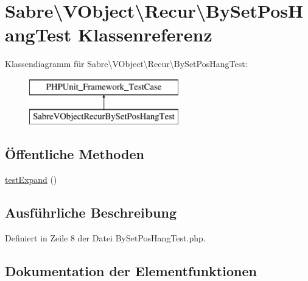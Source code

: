 \hypertarget{class_sabre_1_1_v_object_1_1_recur_1_1_by_set_pos_hang_test}{}\section{Sabre\textbackslash{}V\+Object\textbackslash{}Recur\textbackslash{}By\+Set\+Pos\+Hang\+Test Klassenreferenz}
\label{class_sabre_1_1_v_object_1_1_recur_1_1_by_set_pos_hang_test}
Klassendiagramm für Sabre\textbackslash{}V\+Object\textbackslash{}Recur\textbackslash{}By\+Set\+Pos\+Hang\+Test\+:\begin{figure}[H]
\begin{center}
\leavevmode
\includegraphics[height=2.000000cm]{class_sabre_1_1_v_object_1_1_recur_1_1_by_set_pos_hang_test}
\end{center}
\end{figure}
\subsection*{Öffentliche Methoden}
\begin{DoxyCompactItemize}
\item 
\mbox{\hyperlink{class_sabre_1_1_v_object_1_1_recur_1_1_by_set_pos_hang_test_a410f4212c1f9c2752b4e2b01f2744556}{test\+Expand}} ()
\end{DoxyCompactItemize}


\subsection{Ausführliche Beschreibung}


Definiert in Zeile 8 der Datei By\+Set\+Pos\+Hang\+Test.\+php.



\subsection{Dokumentation der Elementfunktionen}
\mbox{\label{class_sabre_1_1_v_object_1_1_recur_1_1_by_set_pos_hang_test_a410f4212c1f9c2752b4e2b01f2744556}} 
